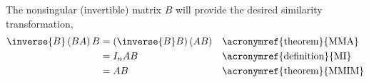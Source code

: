 The nonsingular (invertible) matrix $B$ will provide the desired similarity transformation,
%
\begin{align*}
\inverse{B}\left(BA\right)B
&=\left(\inverse{B}B\right)\left(AB\right)&&\text{\acronymref{theorem}{MMA}}\\
&=I_nAB&&\text{\acronymref{definition}{MI}}\\
&=AB&&\text{\acronymref{theorem}{MMIM}}\\
\end{align*}
%